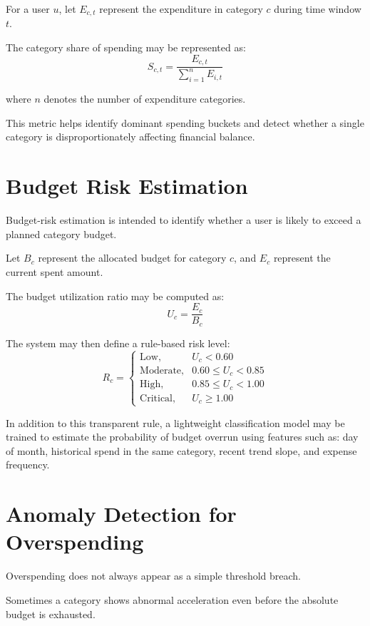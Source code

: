 \documentclass[12pt,a4paper]{report}
\begin{document}
For a user
$u$,
let
$E_{c,t}$
represent the expenditure in category
$c$
during time window
$t$.

The category share of spending may be represented as:
\begin{equation}
S_{c,t} = \frac{E_{c,t}}{\sum_{i=1}^{n} E_{i,t}}
\end{equation}

where
$n$
denotes the number of expenditure categories.

This metric helps identify dominant spending buckets and detect whether a single category is disproportionately affecting financial balance.

\section{Budget Risk Estimation}
Budget-risk estimation is intended to identify whether a user is likely to exceed a planned category budget.

Let
$B_c$
represent the allocated budget for category
$c$,
and
$E_c$
represent the current spent amount.

The budget utilization ratio may be computed as:
\begin{equation}
U_c = \frac{E_c}{B_c}
\end{equation}

The system may then define a rule-based risk level:
\begin{equation}
R_c =
\begin{cases}
\text{Low}, & U_c < 0.60 \\
\text{Moderate}, & 0.60 \leq U_c < 0.85 \\
\text{High}, & 0.85 \leq U_c < 1.00 \\
\text{Critical}, & U_c \geq 1.00
\end{cases}
\end{equation}

In addition to this transparent rule,
a lightweight classification model may be trained to estimate the probability of budget overrun using features such as:
day of month,
historical spend in the same category,
recent trend slope,
and expense frequency.

\section{Anomaly Detection for Overspending}
Overspending does not always appear as a simple threshold breach.

Sometimes a category shows abnormal acceleration even before the absolute budget is exhausted.
\end{document}

